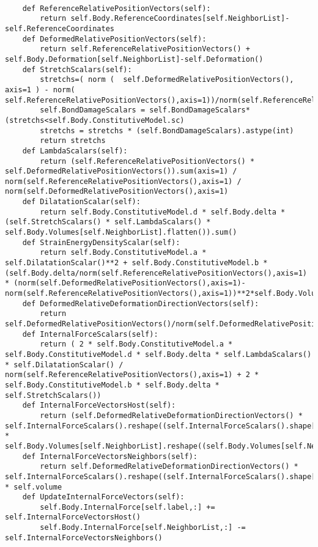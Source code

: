 \documentclass[10pt,a4paper,onecolumn]{article}
\begin{document}
\begin{verbatim}
    
    def ReferenceRelativePositionVectors(self):
        return self.Body.ReferenceCoordinates[self.NeighborList]-self.ReferenceCoordinates
    def DeformedRelativePositionVectors(self):
        return self.ReferenceRelativePositionVectors() + self.Body.Deformation[self.NeighborList]-self.Deformation()
    def StretchScalars(self):
        stretchs=( norm (  self.DeformedRelativePositionVectors(), axis=1 ) - norm( self.ReferenceRelativePositionVectors(),axis=1))/norm(self.ReferenceRelativePositionVectors(),axis=1)
        self.BondDamageScalars = self.BondDamageScalars* (stretchs<self.Body.ConstitutiveModel.sc)
        stretchs = stretchs * (self.BondDamageScalars).astype(int)
        return stretchs
    def LambdaScalars(self):
        return (self.ReferenceRelativePositionVectors() * self.DeformedRelativePositionVectors()).sum(axis=1) / norm(self.ReferenceRelativePositionVectors(),axis=1) / norm(self.DeformedRelativePositionVectors(),axis=1)
    def DilatationScalar(self):
        return self.Body.ConstitutiveModel.d * self.Body.delta * (self.StretchScalars() * self.LambdaScalars() * self.Body.Volumes[self.NeighborList].flatten()).sum()
    def StrainEnergyDensityScalar(self):
        return self.Body.ConstitutiveModel.a * self.DilatationScalar()**2 + self.Body.ConstitutiveModel.b * (self.Body.delta/norm(self.ReferenceRelativePositionVectors(),axis=1) * (norm(self.DeformedRelativePositionVectors(),axis=1)-norm(self.ReferenceRelativePositionVectors(),axis=1))**2*self.Body.Volumes[self.NeighborList]).sum()
    def DeformedRelativeDeformationDirectionVectors(self):
        return self.DeformedRelativePositionVectors()/norm(self.DeformedRelativePositionVectors(),axis=1).reshape((self.DeformedRelativePositionVectors().shape[0],1))
    def InternalForceScalars(self):
        return ( 2 * self.Body.ConstitutiveModel.a * self.Body.ConstitutiveModel.d * self.Body.delta * self.LambdaScalars() * self.DilatationScalar() / norm(self.ReferenceRelativePositionVectors(),axis=1) + 2 * self.Body.ConstitutiveModel.b * self.Body.delta * self.StretchScalars())
    def InternalForceVectorsHost(self):
        return (self.DeformedRelativeDeformationDirectionVectors() * self.InternalForceScalars().reshape((self.InternalForceScalars().shape[0],1)) * self.Body.Volumes[self.NeighborList].reshape((self.Body.Volumes[self.NeighborList].shape[0],1))).sum(axis=0)
    def InternalForceVectorsNeighbors(self):
        return self.DeformedRelativeDeformationDirectionVectors() * self.InternalForceScalars().reshape((self.InternalForceScalars().shape[0],1)) * self.volume
    def UpdateInternalForceVectors(self):
        self.Body.InternalForce[self.label,:] += self.InternalForceVectorsHost()
        self.Body.InternalForce[self.NeighborList,:] -= self.InternalForceVectorsNeighbors()


\end{verbatim}
\end{document}
